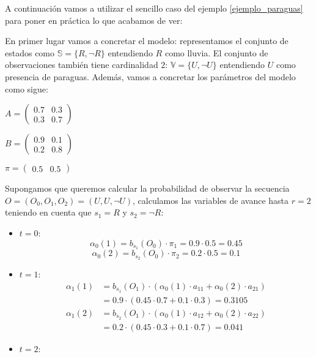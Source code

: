 A continuación vamos a utilizar el sencillo caso del ejemplo \ref{ejemplo_paraguas} para poner en práctica lo que acabamos de ver:
\begin{exampleth}\label{ejemplo_paraguasSol1}
En primer lugar vamos a concretar el modelo: representamos el conjunto de estados como $\mathbb{S}=\{R,\neg R\}$ entendiendo $R$ como lluvia. El conjunto de observaciones también tiene cardinalidad $2$: $\mathbb{V}=\{U,\neg U\}$ entendiendo $U$ como presencia de paraguas. Además, vamos a concretar los parámetros del modelo como sigue:
\begin{center}
    $A=\begin{pmatrix}
    0.7 & 0.3\\
    0.3 & 0.7
    \end{pmatrix}$
\end{center}
\begin{center}
    $B=\begin{pmatrix}
    0.9 & 0.1 \\
    0.2 & 0.8
    \end{pmatrix}$
\end{center}
\begin{center}
    $\pi=\begin{pmatrix}
    0.5 & 0.5
    \end{pmatrix}$
\end{center}
Supongamos que queremos calcular la probabilidad de observar la secuencia $O=(O_0,O_1,O_2)=(U,U,\neg U)$, calculamos las variables de avance hasta $r=2$ teniendo en cuenta que $s_1=R$ y $s_2=\neg R$:
\begin{itemize}
    \item $t=0$:
    \[\alpha_0(1)=b_{s_1}(O_0)\cdot\pi_1=0.9\cdot0.5=0.45\]
    \[\alpha_0(2)=b_{s_2}(O_0)\cdot\pi_2=0.2\cdot0.5=0.1\]
    \item $t=1$:
    \[
    \begin{aligned}
        \alpha_1(1)&=b_{s_1}(O_1)\cdot\left(\alpha_0(1)\cdot a_{11}+\alpha_0(2)\cdot a_{21} \right)\\
        &=0.9\cdot\left( 0.45\cdot0.7+0.1\cdot0.3 \right) = 0.3105
    \end{aligned}
    \]
    \[
    \begin{aligned}
        \alpha_1(2)&=b_{s_2}(O_1)\cdot\left(\alpha_0(1)\cdot a_{12}+\alpha_0(2)\cdot a_{22} \right)\\
        &=0.2\cdot\left(0.45\cdot0.3+0.1\cdot0.7\right)=0.041
    \end{aligned}
    \]
    \item $t=2$:

\end{itemize}
\end{exampleth}
